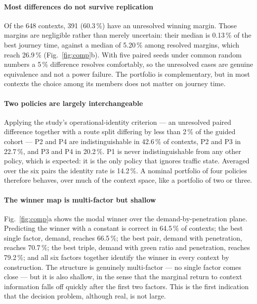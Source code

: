 \paragraph{Most differences do not survive replication}
Of the 648 contexts, 391 (60.3\,\%) have an unresolved winning margin. Those
margins are negligible rather than merely uncertain: their median is 0.13\,\% of
the best journey time, against a median of 5.20\,\% among resolved margins, which
reach 26.9\,\% (Fig.~\ref{fig:comp}b). With five paired seeds under common random
numbers a 5\,\% difference resolves comfortably, so the unresolved cases are
genuine equivalence and not a power failure. The portfolio is complementary, but
in most contexts the choice among its members does not matter on journey time.

\paragraph{Two policies are largely interchangeable}
Applying the study's operational-identity criterion --- an unresolved paired
difference together with a route split differing by less than 2\,\% of the guided
cohort --- P2 and P4 are indistinguishable in 42.6\,\% of contexts, P2 and P3 in
22.7\,\%, and P3 and P4 in 20.2\,\%. P1 is never indistinguishable from any other
policy, which is expected: it is the only policy that ignores traffic state.
Averaged over the six pairs the identity rate is 14.2\,\%. A nominal portfolio of
four policies therefore behaves, over much of the context space, like a portfolio
of two or three.

\paragraph{The winner map is multi-factor but shallow}
Fig.~\ref{fig:comp}a shows the modal winner over the demand-by-penetration
plane. Predicting the winner with a constant is correct in 64.5\,\% of contexts;
the best single factor, demand, reaches 66.5\,\%; the best pair, demand with
penetration, reaches 70.7\,\%; the best triple, demand with green ratio and
penetration, reaches 79.2\,\%; and all six factors together identify the winner
in every context by construction. The structure is genuinely multi-factor --- no
single factor comes close --- but it is also shallow, in the sense that the
marginal return to context information falls off quickly after the first two
factors. This is the first indication that the decision problem, although real,
is not large.

